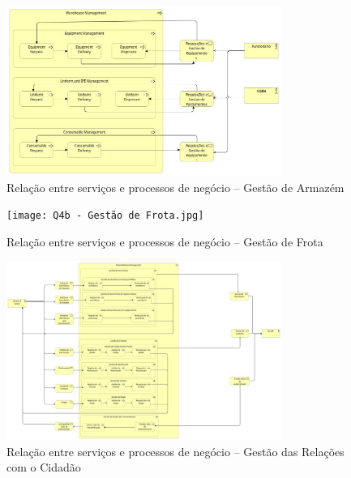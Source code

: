 \documentclass[12pt,a4paper,final]{article}
\begin{document}
    \begin{figure}[H]
        \centering
        \includegraphics[width=0.8\textwidth]{Q4a - Gestão de Armazém.jpg}
        \caption{Relação entre serviços e processos de negócio – Gestão de Armazém}
        \label{fig:q4-armazem}
    \end{figure}

    \begin{figure}[H]
        \centering
        \texttt{[image: Q4b - Gestão de Frota.jpg]}
        \caption{Relação entre serviços e processos de negócio – Gestão de Frota}
        \label{fig:q4-frota}
    \end{figure}

    \begin{figure}[H]
        \centering
        \includegraphics[width=0.8\textwidth]{Q4c - Gestão das Relações com cidadão.jpg}
        \caption{Relação entre serviços e processos de negócio – Gestão das Relações com o Cidadão}
        \label{fig:q4-cidadao}
    \end{figure}
\end{document}
